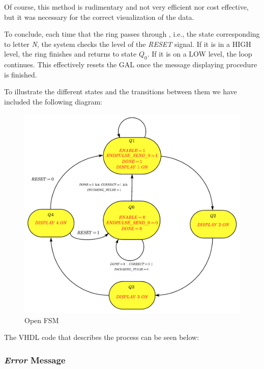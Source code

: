 Of course, this method is rudimentary and not very efficient nor cost effective, but it was necessary for the correct visualization of the data.\medskip

To conclude, each time that the ring passes through , i.e., the state corresponding to letter \textit{N}, the system checks the level of the \textit{RESET} signal. If it is in a HIGH level, the ring finishes and returns to state \textit{$Q_0$}. If it is on a LOW level, the loop continues. This effectively resets the GAL once the message displaying procedure is finished.\medskip

To illustrate the different states and the transitions between them we have included the following diagram:\medskip

\begin{figure}[H]
    \centering
    \includegraphics[scale = 0.75]{Graphics/OPEN-ERROR/OPEN_FSM.pdf}
    \caption{Open FSM}
    \label{fig:OPEN_FSM}
\end{figure}

\clearpage

The VHDL code that describes the process can be seen below:


\clearpage

\subsubsection{\textit{Error} Message}
\medskip

